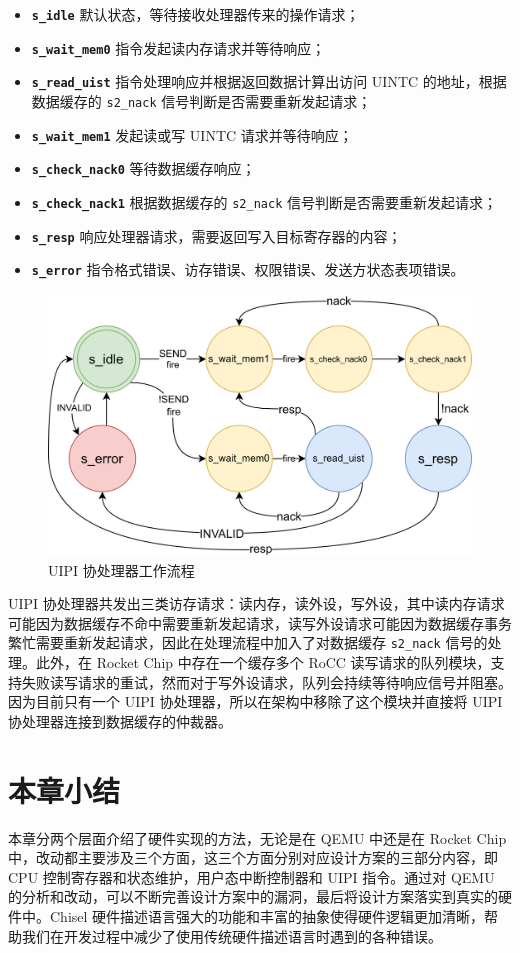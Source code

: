 \begin{itemize}
    \item \texttt{\textbf{s\_idle}} 默认状态，等待接收处理器传来的操作请求；
    \item \texttt{\textbf{s\_wait\_mem0}} \Iuipisend 指令发起读内存请求并等待响应；
    \item \texttt{\textbf{s\_read\_uist}} \Iuipisend 指令处理响应并根据返回数据计算出访问 UINTC 的地址，根据数据缓存的 \texttt{s2\_nack} 信号判断是否需要重新发起请求；
    \item \texttt{\textbf{s\_wait\_mem1}} 发起读或写 UINTC 请求并等待响应；
    \item \texttt{\textbf{s\_check\_nack0}} 等待数据缓存响应；
    \item \texttt{\textbf{s\_check\_nack1}} 根据数据缓存的 \texttt{s2\_nack} 信号判断是否需要重新发起请求；
    \item \texttt{\textbf{s\_resp}} 响应处理器请求，\Iuipiread 需要返回写入目标寄存器的内容；
    \item \texttt{\textbf{s\_error}} 指令格式错误、访存错误、权限错误、发送方状态表项错误。
\end{itemize}

\begin{figure}
    \centering
    \includegraphics[width=1\linewidth]{figures/uipi.png}
    \caption{UIPI 协处理器工作流程}
    \label{fig:uintr3}
\end{figure}

UIPI 协处理器共发出三类访存请求：读内存，读外设，写外设，其中读内存请求可能因为数据缓存不命中需要重新发起请求，读写外设请求可能因为数据缓存事务繁忙需要重新发起请求，因此在处理流程中加入了对数据缓存 \texttt{s2\_nack} 信号的处理。此外，在 Rocket Chip 中存在一个缓存多个 RoCC 读写请求的队列模块，支持失败读写请求的重试，然而对于写外设请求，队列会持续等待响应信号并阻塞。因为目前只有一个 UIPI 协处理器，所以在架构中移除了这个模块并直接将 UIPI 协处理器连接到数据缓存的仲裁器。

\section{本章小结}

本章分两个层面介绍了硬件实现的方法，无论是在 QEMU 中还是在 Rocket Chip 中，改动都主要涉及三个方面，这三个方面分别对应设计方案的三部分内容，即 CPU 控制寄存器和状态维护，用户态中断控制器和 UIPI 指令。通过对 QEMU 的分析和改动，可以不断完善设计方案中的漏洞，最后将设计方案落实到真实的硬件中。Chisel 硬件描述语言强大的功能和丰富的抽象使得硬件逻辑更加清晰，帮助我们在开发过程中减少了使用传统硬件描述语言时遇到的各种错误。